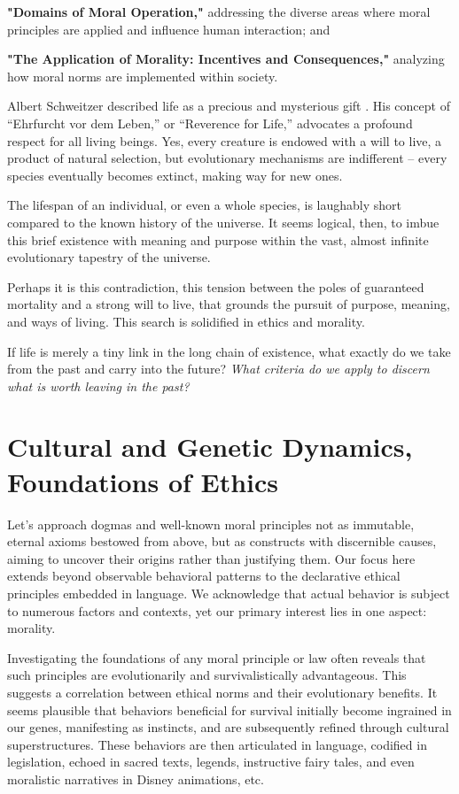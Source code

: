 \documentclass[11pt,a4]{article}
\begin{document}
\textbf{"Domains of Moral Operation,"} addressing the diverse areas where moral principles are applied and influence human interaction; and

\textbf{"The Application of Morality: Incentives and Consequences,"} analyzing how moral norms are implemented within society.

\hspace{5mm}
\par

Albert Schweitzer described life as a precious and mysterious gift \cite{Schweitzer}. His concept of “Ehrfurcht vor dem Leben,” or “Reverence for Life,” advocates a profound respect for all living beings. Yes, every creature is endowed with a will to live, a product of natural selection, but evolutionary mechanisms are indifferent – every species eventually becomes extinct, making way for new ones.
\par
The lifespan of an individual, or even a whole species, is laughably short compared to the known history of the universe. It seems logical, then, to imbue this brief existence with meaning and purpose within the vast, almost infinite evolutionary tapestry of the universe.
\par
Perhaps it is this contradiction, this tension between the poles of guaranteed mortality and a strong will to live, that grounds the pursuit of purpose, meaning, and ways of living. This search is solidified in ethics and morality.

\par
If life is merely a tiny link in the long chain of existence, what exactly do we take from the past and carry into the future? \textit{What criteria do we apply to discern what is worth leaving in the past?}


\section{Cultural and Genetic Dynamics, Foundations of Ethics
}
Let's approach dogmas and well-known moral principles not as immutable, eternal axioms bestowed from above, but as constructs with discernible causes, aiming to uncover their origins rather than justifying them. Our focus here extends beyond observable behavioral patterns to the declarative ethical principles embedded in language. We acknowledge that actual behavior is subject to numerous factors and contexts, yet our primary interest lies in one aspect: morality.

\par
Investigating the foundations of any moral principle or law often reveals that such principles are evolutionarily and survivalistically advantageous. This suggests a correlation between ethical norms and their evolutionary benefits. It seems plausible that behaviors beneficial for survival initially become ingrained in our genes, manifesting as instincts, and are subsequently refined through cultural superstructures. These behaviors are then articulated in language, codified in legislation, echoed in sacred texts, legends, instructive fairy tales, and even moralistic narratives in Disney animations, etc.
\end{document}
